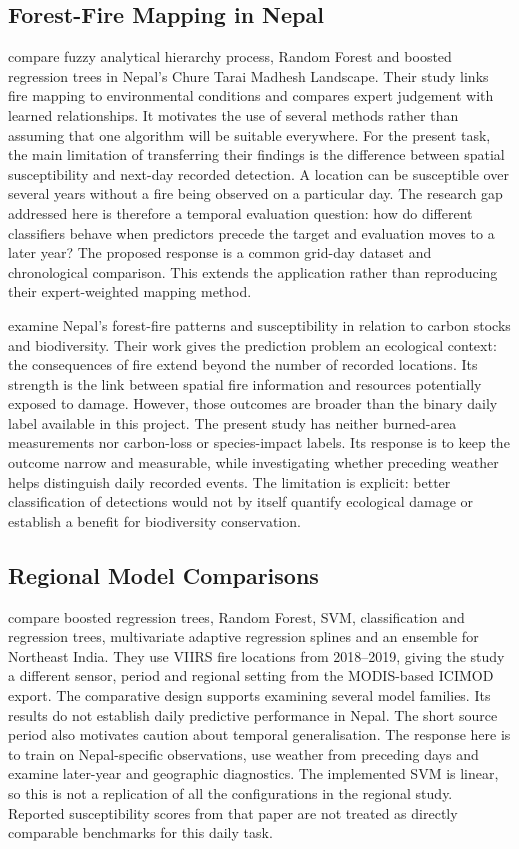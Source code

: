 \documentclass[conference,a4paper]{IEEEtran}
\begin{document}
\subsection{Forest-Fire Mapping in Nepal}
\citet{dhakal} compare fuzzy analytical hierarchy process, Random Forest and boosted regression trees in Nepal's Chure Tarai Madhesh Landscape. Their study links fire mapping to environmental conditions and compares expert judgement with learned relationships. It motivates the use of several methods rather than assuming that one algorithm will be suitable everywhere. For the present task, the main limitation of transferring their findings is the difference between spatial susceptibility and next-day recorded detection. A location can be susceptible over several years without a fire being observed on a particular day. The research gap addressed here is therefore a temporal evaluation question: how do different classifiers behave when predictors precede the target and evaluation moves to a later year? The proposed response is a common grid-day dataset and chronological comparison. This extends the application rather than reproducing their expert-weighted mapping method.

\citet{dahal} examine Nepal's forest-fire patterns and susceptibility in relation to carbon stocks and biodiversity. Their work gives the prediction problem an ecological context: the consequences of fire extend beyond the number of recorded locations. Its strength is the link between spatial fire information and resources potentially exposed to damage. However, those outcomes are broader than the binary daily label available in this project. The present study has neither burned-area measurements nor carbon-loss or species-impact labels. Its response is to keep the outcome narrow and measurable, while investigating whether preceding weather helps distinguish daily recorded events. The limitation is explicit: better classification of detections would not by itself quantify ecological damage or establish a benefit for biodiversity conservation.

\subsection{Regional Model Comparisons}
\citet{sarkar} compare boosted regression trees, Random Forest, SVM, classification and regression trees, multivariate adaptive regression splines and an ensemble for Northeast India. They use VIIRS fire locations from 2018--2019, giving the study a different sensor, period and regional setting from the MODIS-based ICIMOD export. The comparative design supports examining several model families. Its results do not establish daily predictive performance in Nepal. The short source period also motivates caution about temporal generalisation. The response here is to train on Nepal-specific observations, use weather from preceding days and examine later-year and geographic diagnostics. The implemented SVM is linear, so this is not a replication of all the configurations in the regional study. Reported susceptibility scores from that paper are not treated as directly comparable benchmarks for this daily task.
\end{document}
